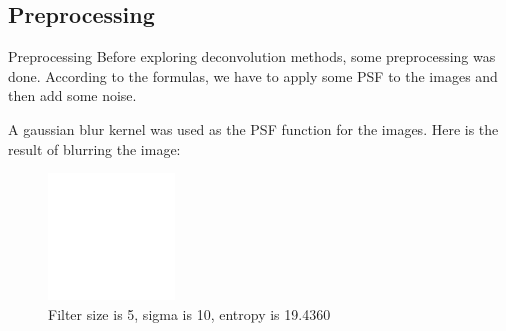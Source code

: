 \documentclass[aspectratio=1610]{beamer}
\begin{document}
\subsection{Preprocessing}
\begin{frame}{Preprocessing}
  Before exploring deconvolution methods, some preprocessing
  was done. According to the formulas, we have to apply some PSF
  to the images and then add some noise. 
  
  A gaussian blur kernel was used as the PSF function for the images. 
  Here is the result of blurring the image:
  \begin{figure}
    \centering
    \includegraphics[width=0.30\textwidth]{images/blurred.png}
    \caption{Filter size is 5, sigma is 10, entropy is 19.4360}
    \label{fig:blurred}
  \end{figure}
\end{frame}
\end{document}

